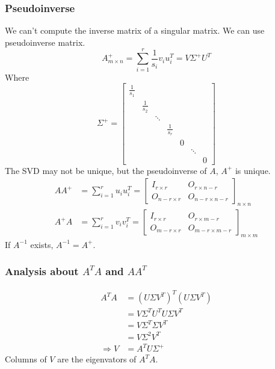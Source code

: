\documentclass[11pt,a4paper]{article}
\begin{document}
\subsubsection{Pseudoinverse}
We can't compute the inverse matrix of a singular matrix. We can use pseudoinverse matrix.
$$A^+_{m\times n}=\sum_{i=1}^r\frac{1}{s_i}v_iu_i^T=V\Sigma^+U^T$$
Where $$\Sigma^+=\begin{bmatrix}
    \frac{1}{s_1}&&&&&&\\
    &\frac{1}{s_2}&&&&&\\
    &&\ddots&&&&\\
    &&&\frac{1}{s_r}&&&\\
    &&&&0&&\\
    &&&&&\ddots&\\
    &&&&&&0
\end{bmatrix}$$
The SVD may not be unique, but the pseudoinverse of $A$, $A^+$ is unique.
\begin{equation}
    \begin{aligned}
        AA^+&=\sum_{i=1}^ru_iu_i^T=\begin{bmatrix}
            I_{r\times r}&	O_{r\times n-r}\\
            O_{n-r\times r}&	O_{n-r\times n-r}
        \end{bmatrix}_{n\times n}\\
        A^+A&=\sum_{i=1}^rv_iv_i^T=\begin{bmatrix}
            I_{r\times r}&	O_{r\times m-r}\\
            O_{m-r\times r}&	O_{m-r\times m-r}
        \end{bmatrix}_{m\times m}
    \end{aligned}
    \nonumber
\end{equation}
If $A^{-1}$ exists, $A^{-1}=A^+$.

\subsubsection{Analysis about $A^TA$ and $AA^T$}
\begin{equation}
    \begin{aligned}
        A^TA&=(U\Sigma V^T)^T(U\Sigma V^T)\\
        &=V\Sigma^TU^TU\Sigma V^T\\
        &=V\Sigma^T\Sigma V^T\\
        &=V\Sigma^2 V^T\\
        \Rightarrow	V&=A^TU\Sigma^+
    \end{aligned}
    \nonumber
\end{equation}
Columns of $V$ are the eigenvators of $A^TA$.
\end{document}
